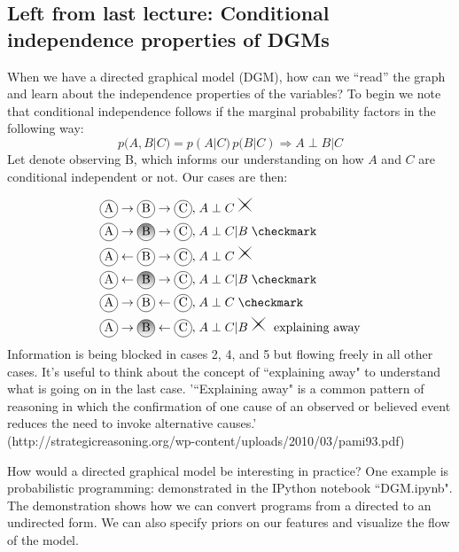 \documentclass{article}
\begin{document}


\subsection{Left from last lecture: Conditional independence properties of DGMs}

When we have a directed graphical model (DGM), how can we ``read'' the graph and learn about the independence properties of the variables?
To begin we note that conditional independence follows if the marginal probability factors in the following way:
\begin{equation}
p(A,B|C) = p(A|C) \, p(B|C) \Rightarrow A \perp B | C
\end{equation}
Let  denote observing B, which informs our understanding on how $A$ and $C$ are conditional independent or not. Our cases are then:

\begin{align}
\encirc{A} \rightarrow \encirc{B} \rightarrow \encirc{C}, \; &A \perp C \; \crossmark \\
\encirc{A} \rightarrow \encircshaded{B} \rightarrow \encirc{C}, \; &A \perp C|B \; \checkmark \\
\encirc{A} \leftarrow \encirc{B} \rightarrow \encirc{C}, \; &A \perp C \; \crossmark \\
\encirc{A} \leftarrow \encircshaded{B} \rightarrow \encirc{C}, \; &A \perp C|B \; \checkmark \\
\encirc{A} \rightarrow \encirc{B} \leftarrow \encirc{C}, \; &A \perp C \; \checkmark \\
\encirc{A} \rightarrow \encircshaded{B} \leftarrow \encirc{C}, \; &A \perp C|B \; \crossmark \textrm{\ \ explaining away}
\end{align}
Information is being blocked in cases 2, 4, and 5 but flowing freely in all other cases.
It's useful to think about the concept of ``explaining away" to understand what is going on in the last case. '``Explaining away" is a common pattern of reasoning in which the confirmation of one cause of an observed or believed event reduces the need to invoke alternative causes.'\\(http://strategicreasoning.org/wp-content/uploads/2010/03/pami93.pdf)
\smallskip

How would a directed graphical model be interesting in practice?
One example is probabilistic programming: demonstrated in the IPython notebook ``DGM.ipynb".
The demonstration shows how we can convert programs from a directed to an undirected form. We can also specify priors on our features and visualize the flow of the model.
\smallskip
\end{document}
